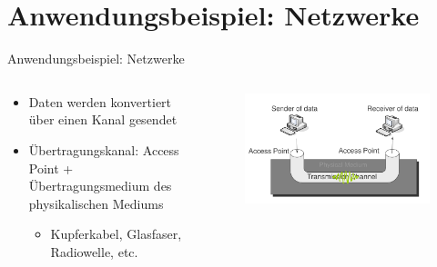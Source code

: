 \documentclass[xcolor=dvipsnames,aspectratio=169]{beamer}
\begin{document}
\section{Anwendungsbeispiel: Netzwerke}
\begin{frame}{Anwendungsbeispiel: Netzwerke}
\begin{columns}[T] %
\begin{column}{.54\textwidth}
\begin{itemize}
	\item Daten werden konvertiert über einen Kanal gesendet
	\item Übertragungskanal: Access Point + Übertragungsmedium des physikalischen Mediums
	\begin{itemize}
		\item Kupferkabel, Glasfaser, Radiowelle, etc.
	\end{itemize}
\end{itemize}
\end{column}%
\hfill%
\begin{column}{.48\textwidth}
\begin{figure}
\includegraphics[scale=0.3]{rxtx}
\end{figure}
\end{column}%
\end{columns}
\end{frame}
\end{document}
